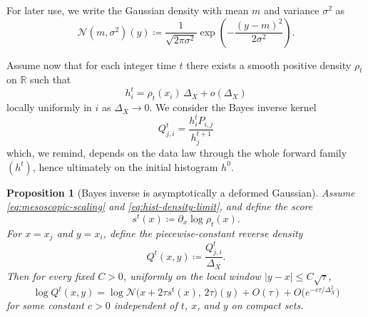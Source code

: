 \documentclass[11pt]{article}
\newtheorem{proposition}{Proposition}
\begin{document}
For later use, we write the Gaussian density with mean $m$ and variance $\sigma^2$ as
\[
\mathcal N(m,\sigma^2)(y)
\coloneqq
\frac{1}{\sqrt{2\pi\sigma^2}}
\exp\!\left(-\frac{(y-m)^2}{2\sigma^2}\right).
\]

Assume now that for each integer time $t$ there exists a smooth positive density $\rho_t$ on $\mathbb R$ such that
\begin{equation}
\label{eq:hist-density-limit}
h_i^t=\rho_t(x_i)\,\Delta_X+o(\Delta_X)
\end{equation}
locally uniformly in $i$ as $\Delta_X\to0$. We consider the Bayes inverse kernel
\[
Q_{j,i}^t=\frac{h_i^t P_{i,j}}{h_j^{t+1}}
\]
which, we remind, depends on the data law through the whole forward family $(h^t)$, hence ultimately on the initial histogram $h^0$.

\begin{proposition}[Bayes inverse is asymptotically a deformed Gaussian]
\label{prop:bayes-deformed-gaussian}
Assume \eqref{eq:mesoscopic-scaling} and \eqref{eq:hist-density-limit}, and define the score
\[
s^t(x)\coloneqq \partial_x\log \rho_t(x).
\]
For $x=x_j$ and $y=x_i$, define the piecewise-constant reverse density
\[
Q^t(x,y)\coloneqq \frac{Q_{j,i}^t}{\Delta_X}.
\]
Then for every fixed $C>0$, uniformly on the local window $|y-x|\le C\sqrt{\tau}$,
\begin{equation}
\label{eq:bayes-log-gaussian-approx}
\log Q^t(x,y)
=
\log \mathcal N\!\big(x+2\tau s^t(x),\,2\tau\big)(y)
+ O(\tau)
+ O\!\big(e^{-c\tau/\Delta_X^2}\big)
\end{equation}
for some constant $c>0$ independent of $t$, $x$, and $y$ on compact sets.
\end{proposition}
\end{document}
